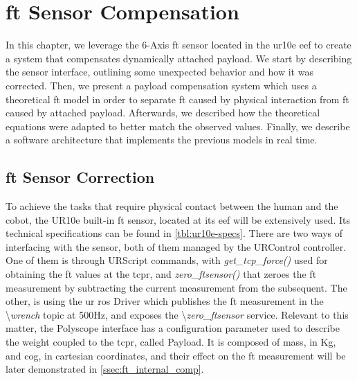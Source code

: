 \chapter{\acl{ft} Sensor Compensation}
\label{chp:3-ft-sensor-correction}

\par In this chapter, we leverage the 6-Axis \ac{ft} sensor located in the \ac{ur10e} \ac{eef} to create a system that compensates dynamically attached payload. We start by describing the sensor interface, outlining some unexpected behavior and how it was corrected. Then, we present a payload compensation system which uses a theoretical \ac{ft} model in order to separate \ac{ft} caused by physical interaction from \ac{ft} caused by attached payload. Afterwards, we described how the theoretical equations were adapted to better match the observed values. Finally, we describe a software architecture that implements the previous models in real time.





\section{\ac{ft} Sensor Correction}

\par To achieve the tasks that require physical contact between the human and the cobot, the UR10e built-in \ac{ft} sensor, located at its \ac{eef} will be extensively used. Its technical specifications can be found in \autoref{tbl:ur10e-specs}. There are two ways of interfacing with the sensor, both of them managed by the URControl controller. One of them is through URScript commands, with \textit{get\_tcp\_force()} used for obtaining the \ac{ft} values at the \acs{tcpr}, and \textit{zero\_ftsensor()} that zeroes the \ac{ft} measurement by subtracting the current measurement from the subsequent. The other, is using the \ac{ur} \ac{ros} Driver which publishes the \ac{ft} measurement in the \textbackslash\textit{wrench} topic at 500Hz, and exposes the \textbackslash\textit{zero\_ftsensor} service. Relevant to this matter, the Polyscope interface has a configuration parameter used to describe the weight coupled to the \acs{tcpr}, called Payload. It is composed of mass, in Kg, and \ac{cog}, in cartesian coordinates, and their effect on the \ac{ft} measurement will be later demonstrated in \autoref{ssec:ft_internal_comp}.



